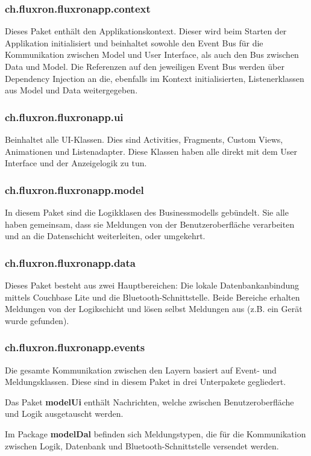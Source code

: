 \subsubsection{ch.fluxron.fluxronapp.context}
Dieses Paket enthält den Applikationskontext. Dieser wird beim Starten der Applikation initialisiert und beinhaltet sowohle den Event Bus für die Kommunikation zwischen Model und User Interface, als auch den Bus zwischen Data und Model. Die Referenzen auf den jeweiligen Event Bus werden über Dependency Injection an die, ebenfalls im Kontext initialisierten, Listenerklassen aus Model und Data weitergegeben.

\subsubsection{ch.fluxron.fluxronapp.ui}
Beinhaltet alle UI-Klassen. Dies sind Activities, Fragments, Custom Views, Animationen und Listenadapter. Diese Klassen haben alle direkt mit dem User Interface und der Anzeigelogik zu tun.

\subsubsection{ch.fluxron.fluxronapp.model}
In diesem Paket sind die Logikklasen des Businessmodells gebündelt. Sie alle haben gemeinsam, dass sie Meldungen von der Benutzeroberfläche verarbeiten und an die Datenschicht weiterleiten, oder umgekehrt.

\subsubsection{ch.fluxron.fluxronapp.data}
Dieses Paket besteht aus zwei Hauptbereichen: Die lokale Datenbankanbindung mittels Couchbase Lite und die Bluetooth-Schnittstelle. Beide Bereiche erhalten Meldungen von der Logikschicht und lösen selbst Meldungen aus (z.B. ein Gerät wurde gefunden).

\subsubsection{ch.fluxron.fluxronapp.events}
Die gesamte Kommunikation zwischen den Layern basiert auf Event- und Meldungsklassen. Diese sind in diesem Paket in drei Unterpakete gegliedert.

Das Paket \textbf{modelUi} enthält Nachrichten, welche zwischen Benutzeroberfläche und Logik ausgetauscht werden.

Im Package \textbf{modelDal} befinden sich Meldungstypen, die für die Kommunikation zwischen Logik, Datenbank und Bluetooth-Schnittstelle versendet werden.

